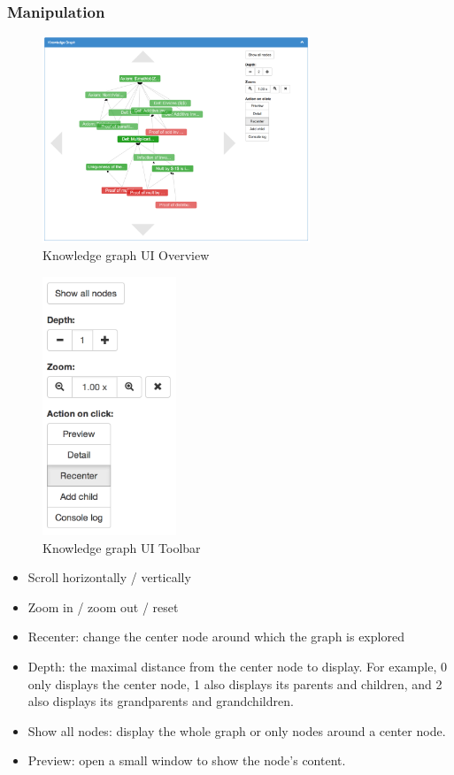 \documentclass{acm_proc_article-sp}
\begin{document}
\subsubsection{Manipulation}
\begin{figure}[h!]
\centering
\includegraphics[width=8cm]{toolbar1.png}
\caption{Knowledge graph UI Overview}
\end{figure}
\begin{figure}[h!]
\centering
\includegraphics[width=4cm]{toolbar2.png}
\caption{Knowledge graph UI Toolbar}
\end{figure}
\begin{itemize}
\item Scroll horizontally / vertically
\item Zoom in / zoom out / reset
\item Recenter: change the center node around which the graph is explored
\item Depth: the maximal distance from the center node to display. 
For example, 0 only displays the center node, 1 also displays its parents and children, and 2 also displays its grandparents and grandchildren.
\item Show all nodes: display the whole graph or only nodes around a center node.
\item Preview: open a small window to show the node's content.
\end{itemize}
\end{document}
